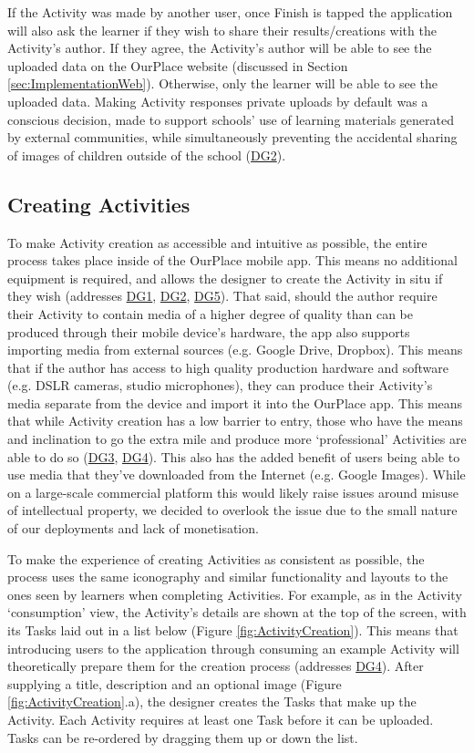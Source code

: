 If the Activity was made by another user, once Finish is tapped the application will also ask the learner if they wish to share their results/creations with the Activity's author. If they agree, the Activity's author will be able to see the uploaded data on the OurPlace website (discussed in Section \ref{sec:ImplementationWeb}). Otherwise, only the learner will be able to see the uploaded data. Making Activity responses private uploads by default was a conscious decision, made to support schools' use of learning materials generated by external communities, while simultaneously preventing the accidental sharing of images of children outside of the school (\hyperref[DG2]{DG2}). 

\subsection{Creating Activities}

To make Activity creation as accessible and intuitive as possible, the entire process takes place inside of the OurPlace mobile app. This means no additional equipment is required, and allows the designer to create the Activity in situ if they wish (addresses \hyperref[DG1]{DG1}, \hyperref[DG2]{DG2}, \hyperref[DG5]{DG5}). That said, should the author require their Activity to contain media of a higher degree of quality than can be produced through their mobile device's hardware, the app also supports importing media from external sources (e.g. Google Drive, Dropbox). This means that if the author has access to high quality production hardware and software (e.g. DSLR cameras, studio microphones), they can produce their Activity's media separate from the device and import it into the OurPlace app. This means that while Activity creation has a low barrier to entry, those who have the means and inclination to go the extra mile and produce more `professional' Activities are able to do so (\hyperref[DG3]{DG3}, \hyperref[DG4]{DG4}). This also has the added benefit of users being able to use media that they've downloaded from the Internet (e.g. Google Images). While on a large-scale commercial platform this would likely raise issues around misuse of intellectual property, we decided to overlook the issue due to the small nature of our deployments and lack of monetisation.

To make the experience of creating Activities as consistent as possible, the process uses the same iconography and similar functionality and layouts to the ones seen by learners when completing Activities. For example, as in the Activity `consumption' view, the Activity's details are shown at the top of the screen, with its Tasks laid out in a list below (Figure \ref{fig:ActivityCreation}). This means that introducing users to the application through consuming an example Activity will theoretically prepare them for the creation process (addresses \hyperref[DG4]{DG4}). After supplying a title, description and an optional image (Figure \ref{fig:ActivityCreation}.a), the designer creates the Tasks that make up the Activity. Each Activity requires at least one Task before it can be uploaded. Tasks can be re-ordered by dragging them up or down the list.

